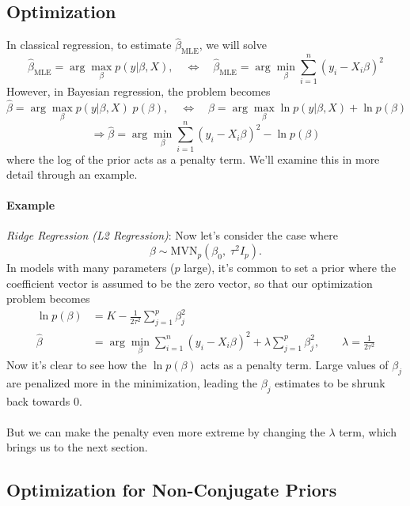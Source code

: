 \documentclass[a4paper,12pt]{scrartcl}
\begin{document}
\newpage
\subsection{Optimization}

In classical regression, to estimate $\hat{\beta}_{\text{MLE}}$,
we will solve
\[ \hat{\beta}_{\text{MLE}} = \arg \max_{\beta} p(y | \beta, X), 
   \quad \Leftrightarrow \quad \hat{\beta}_{\text{MLE}} = 
   \arg \min_{\beta} \sum^n_{i=1} (y_i - X_i \beta)^2 
   \]
However, in Bayesian regression, the problem becomes
\[ \hat{\beta}= \arg \max_{\beta} p(y | \beta, X)\;p(\beta),
   \quad \Leftrightarrow \quad \hat{\beta} = 
   \arg \max_{\beta} \ln p(y | \beta, X) + \ln p(\beta)
   \]
\[ \Rightarrow \hat{\beta} = \arg \min_\beta \sum^n_{i=1} 
   (y_i - X_i \beta)^2 - \ln p(\beta) \]
where the log of the prior acts as a penalty term. We'll examine this
in more detail through an example.

\paragraph{Example} {\sl Ridge Regression (L2 Regression)}:
Now let's consider the case where 
   \[ \beta \sim \text{MVN}_p(\beta_0, \; \tau^2 I_p).\]
In models with many parameters ($p$ large), it's common to set a
prior where the coefficient vector is assumed to be the zero vector,
so that our optimization problem becomes
\begin{align*}
   \ln p(\beta) &= K - \frac{1}{2\tau^2} \sum^p_{j=1} \beta_j^2\\
   \hat{\beta} &= \arg \min_\beta \sum^n_{i=1} 
      (y_i - X_i \beta)^2 + \lambda  \sum^p_{j=1} \beta_j^2, \qquad
      \lambda = \frac{1}{2\tau^2}
\end{align*}
Now it's clear to see how the $\ln p(\beta)$ acts as a penalty term.
Large values of $\beta_j$ are penalized more in the minimization,
leading the $\beta_j$ estimates to be shrunk back towards 0. 
\\
\\
But we can make the penalty even more extreme by changing the 
$\lambda$ term, which brings us to the next section.

\subsection{Optimization for Non-Conjugate Priors}
\end{document}

